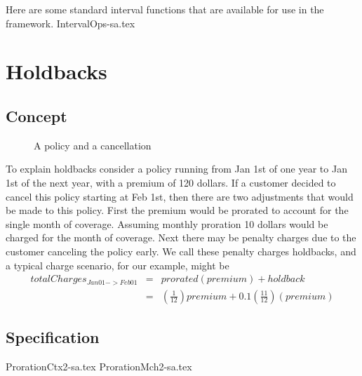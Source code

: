 Here are some standard interval functions that are available for use in the framework.
{IntervalOps-sa.tex}

\section{Holdbacks}
\label{sec:03:3}

\subsection{Concept}

\begin{figure}[ht]
  \caption{
    A policy and a cancellation
  }
  \label{fig:3:1}
\end{figure}

To explain holdbacks consider a policy running from Jan 1st of one year to Jan 1st of the next year, with a
premium of 120 dollars. If
a customer decided to cancel this policy starting at Feb 1st, then there are two adjustments that would
be made to this policy. First the premium would be prorated to account for the single month of coverage.
Assuming monthly proration 10 dollars would be charged for the month of coverage. Next there may be penalty
charges due to the customer canceling the policy early. We call these penalty charges holdbacks, and a typical
charge scenario, for our example, might be
\begin{eqnarray*}
totalCharges_{Jan01->Feb01} & = & prorated(premium) + holdback \\
                          & = & (\frac{1}{12}) premium + 0.1(\frac{11}{12})(premium)
\end{eqnarray*}

\subsection{Specification}

{ProrationCtx2-sa.tex}
{ProrationMch2-sa.tex}

